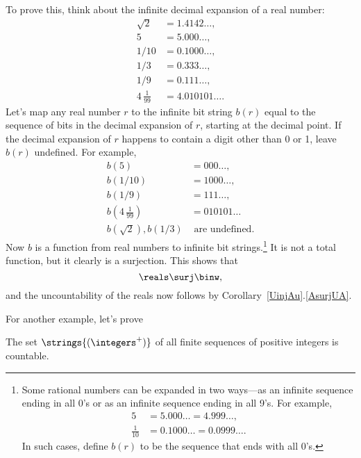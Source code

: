 To prove this, think about the infinite decimal expansion of a real
number:
\begin{align*}
\sqrt{2} & = 1.4142\dots,\\
5 & = 5.000\dots,\\
1/10 & = 0.1000\dots,\\
1/3 & = 0.333\dots,\\
1/9 & = 0.111\dots,\\
4\, \frac{1}{99} & = 4.010101\dots.
\end{align*}
Let's map any real number $r$ to the infinite bit string $b(r)$ equal
to the sequence of bits in the decimal expansion of $r$, starting at the decimal
point.  If the decimal expansion of $r$ happens to contain a digit
other than 0 or 1, leave $b(r)$ undefined.  For example, 
\begin{align*}
b(5) & = 000\dots,\\
b(1/10) & = 1000\dots,\\
b(1/9) & = 111\dots,\\
b(4\, \frac{1}{99}) & = 010101\dots\\
b(\sqrt{2}), b(1/3) &\text{ are undefined}.
\end{align*}
Now $b$ is a function from real numbers to infinite bit
strings.\footnote{Some rational numbers can be expanded in two
  ways---as an infinite sequence ending in all 0's or as an infinite
  sequence ending in all 9's.  For example,
\begin{align*}
5 & = 5.000\dots = 4.999\dots,\\
\frac{1}{10} & = 0.1000\dots = 0.0999\dots.
\end{align*}
In such cases, define $b(r)$ to be the sequence that ends with all
0's.}  It is not a total function, but it clearly is a surjection.
This shows that
\[
\reals \surj \binw,
\]
and the uncountability of the reals now follows by
Corollary~\ref{UinjAu}.\eqref{AsurjUA}.

For another example, let's prove
\begin{corollary}\label{countN*}
The set $\strings{(\integers^+)}$ of all finite sequences of positive
integers is countable.
\end{corollary}

